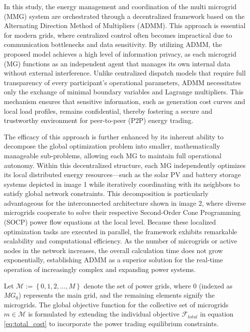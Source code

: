 \documentclass[preprint,12pt]{elsarticle}
\begin{document}
In this study, the energy management and coordination of the multi microgrid (MMG) system are orchestrated through a decentralized framework based on the Alternating Direction Method of Multipliers (ADMM). This approach is essential for modern grids, where centralized control often becomes impractical due to communication bottlenecks and data sensitivity. By utilizing ADMM, the proposed model achieves a high level of information privacy, as each microgrid (MG) functions as an independent agent that manages its own internal data without external interference. Unlike centralized dispatch models that require full transparency of every participant’s operational parameters, ADMM necessitates only the exchange of minimal boundary variables and Lagrange multipliers. This mechanism ensures that sensitive information, such as generation cost curves and local load profiles, remains confidential, thereby fostering a secure and trustworthy environment for peer-to-peer (P2P) energy trading.

The efficacy of this approach is further enhanced by its inherent ability to decompose the global optimization problem into smaller, mathematically manageable sub-problems, allowing each MG to maintain full operational autonomy. Within this decentralized structure, each MG independently optimizes its local distributed energy resources—such as the solar PV and battery storage systems depicted in image 1 while iteratively coordinating with its neighbors to satisfy global network constraints.
This decomposition is particularly advantageous for the interconnected architecture shown in image 2, where diverse microgrids cooperate to solve their respective Second-Order Cone Programming (SOCP) power flow equations at the local level. Because these localized optimization tasks are executed in parallel, the framework exhibits remarkable scalability and computational efficiency. As the number of microgrids or active nodes in the network increases, the overall calculation time does not grow exponentially, establishing ADMM as a superior solution for the real-time operation of increasingly complex and expanding power systems.

Let $\mathcal{M} := \left\{ {0,1,2,...,M} \right\}$ denote the set of power grids, where $0$ (indexed as $MG_0$) represents the main grid, and the remaining elements signify the microgrids. 
The global objective function for the collective set of microgrids $m \in \mathcal{M}$ is formulated by extending the individual objective $\mathcal{F}_{total}$ in equation \eqref{eq:total_cost} to incorporate the power trading equilibrium constraints. 
\end{document}
